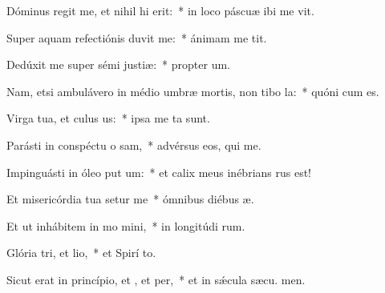 \item Dóminus regit me, et nihil hi erit:~* in loco páscuæ ibi me vit.
\item Super aquam refectiónis duvit me:~* ánimam me tit.
\item Dedúxit me super sémi justiæ:~* propter  um.
\item Nam, etsi ambulávero in médio umbræ mortis, non tibo la:~* quóni  cum es.
\item Virga tua, et culus us:~* ipsa me ta sunt.
\item Parásti in conspéctu o sam,~* advérsus eos, qui  me.
\item Impinguásti in óleo put um:~* et calix meus inébrians  rus est!
\item Et misericórdia tua setur me~* ómnibus diébus  æ.
\item Et ut inhábitem in mo mini,~* in longitúdi rum.
\item Glória tri, et lio,~* et Spirí to.
\item Sicut erat in princípio, et , et per,~* et in sǽcula sæcu. men.
